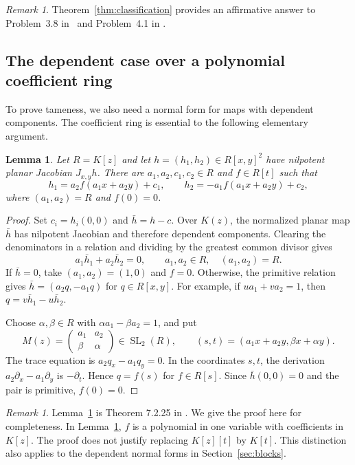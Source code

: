 \documentclass[11pt,reqno]{amsart}
\newtheorem{lemma}[theorem]{Lemma}
\theoremstyle{definition}
\theoremstyle{remark}
\newtheorem{remark}[theorem]{Remark}
\numberwithin{equation}{section}
\DeclareMathOperator{\SL}{SL}
\begin{document}
\begin{remark}
Theorem~\ref{thm:classification} provides an affirmative answer to Problem~3.8 in~\cite{YanTang} and Problem~4.1 in \cite{HeYan}.
\end{remark}

\subsection{The dependent case over a polynomial coefficient ring}
To prove tameness, we also need a normal form for maps with dependent components. The coefficient ring is essential to the following elementary argument.

\begin{lemma}\label{lem:planar-form}
Let $R=K[z]$ and let $h=(h_1,h_2)\in R[x,y]^2$ have nilpotent planar Jacobian $J_{x,y}h$. There are $a_1,a_2,c_1,c_2\in R$ and $f\in R[t]$ such that
\begin{equation}\label{eq:dependent-form}
 h_1=a_2f(a_1x+a_2y)+c_1,\qquad
 h_2=-a_1f(a_1x+a_2y)+c_2,
\end{equation}
where $(a_1,a_2)=R$ and $f(0)=0$.
\end{lemma}

\begin{proof}
Set $c_i=h_i(0,0)$ and $\bar h=h-c$. Over $K(z)$, the normalized planar map $\bar h$ has nilpotent Jacobian and therefore dependent components. Clearing the denominators in a relation and dividing by the greatest common divisor gives
\[
 a_1\bar h_1+a_2\bar h_2=0,\qquad a_1,a_2\in R,\quad(a_1,a_2)=R.
\]
If $\bar h=0$, take $(a_1,a_2)=(1,0)$ and $f=0$. Otherwise, the primitive relation gives
$\bar h=(a_2q,-a_1q)$ for $q\in R[x,y]$. For example, if $u a_1+v a_2=1$, then $q=v\bar h_1-u\bar h_2$.

Choose $\alpha,\beta\in R$ with $\alpha a_1-\beta a_2=1$, and put
\begin{equation}\label{eq:unimodular-M}
 M(z)=\begin{pmatrix}a_1&a_2\\ \beta&\alpha\end{pmatrix}\in\SL_2(R),
 \qquad (s,t)=(a_1x+a_2y,\beta x+\alpha y).
\end{equation}
The trace equation is $a_2q_x-a_1q_y=0$. In the coordinates $s,t$, the derivation $a_2\partial_x-a_1\partial_y$ is $-\partial_t$. Hence $q=f(s)$ for $f\in R[s]$. Since $\bar h(0,0)=0$ and the pair is primitive, $f(0)=0$.
\end{proof}

\begin{remark}\label{rem:coefficient-ring}
Lemma~\ref{lem:planar-form} is Theorem 7.2.25 in \cite{EssenBook}. We give the proof here for completeness. In Lemma~\ref{lem:planar-form}, $f$ is a polynomial in one variable with coefficients in $K[z]$. The proof does not justify replacing $K[z][t]$ by $K[t]$. This distinction also applies to the dependent normal forms in Section~\ref{sec:blocks}.
\end{remark}
\end{document}
